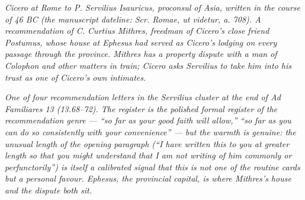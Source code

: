 
\textit{Cicero at Rome to P. Servilius Isauricus, proconsul of
Asia, written in the course of 46 BC (the manuscript dateline:
\textit{Scr. Romae, ut videtur, a. 708}). A recommendation of
C. Curtius Mithres, freedman of Cicero's close friend Postumus,
whose house at Ephesus had served as Cicero's lodging on every
passage through the province. Mithres has a property dispute
with a man of Colophon and other matters in train; Cicero asks
Servilius to take him into his trust as one of Cicero's own
intimates.}

\textit{One of four recommendation letters in the Servilius
cluster at the end of \textit{Ad Familiares} 13 (13.68--72). The
register is the polished formal register of the recommendation
genre --- ``so far as your good faith will allow,'' ``so far as
you can do so consistently with your convenience'' --- but the
warmth is genuine: the unusual length of the opening paragraph
(``I have written this to you at greater length so that you might
understand that I am not writing of him commonly or
perfunctorily'') is itself a calibrated signal that this is not
one of the routine cards but a personal favour. Ephesus, the
provincial capital, is where Mithres's house and the dispute
both sit.}
